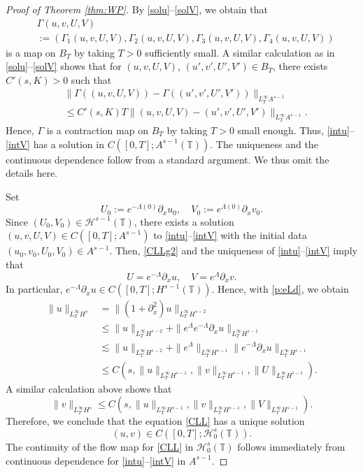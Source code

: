 \documentclass[%
11pt,  reqno]{amsart}
\newcommand{\T}{\mathbb{T}}
\renewcommand{\H}{\mathcal H}
\newcommand{\G}{\Gamma}
\newcommand{\Ld}{\Lambda}
\newcommand{\dx}{\partial_x}
\newcommand{\les}{\lesssim}
\numberwithin{equation}{section}
\numberwithin{theorem}{section}
\let\Im=\undefined\DeclareMathOperator*{\Im}{Im}
\begin{document}
\begin{proof}[Proof of Theorem \ref{thm:WP}]
By \eqref{solu}--\eqref{solV}, we obtain that 
\[
\begin{aligned}
&\G (u,v,U,V) 
\\
&:= (\G_1(u,v,U,V), \G_2(u,v,U,V), \G_3(u,v,U,V), \G_4(u,v,U,V))
\end{aligned}
\] 
is a map on $B_T$ by taking $T > 0$ sufficiently small.
A similar calculation as in \eqref{solu}--\eqref{solV} shows that for 
$(u,v, U, V)$, $(u', v', U', V') \in B_T$, there exists 
$C'(s, K) > 0$ such that
\[
\begin{aligned}
&\| \G((u, v, U, V)) - \G ((u',v',U',V')) \|_{L_T^\infty A^{s-1}}
\\
&\le
C'(s, K) T \|(u,v, U, V) - (u', v', U', V')\|_{L_T^\infty A^{s-1}}.
\end{aligned}
\] 
Hence, $\G$ is a contraction map on $B_T$ by taking $T > 0$ small enough.
Thus, \eqref{intu}--\eqref{intV} has a solution in $C([0,T]; A^{s-1}(\T))$.
The uniqueness and the continuous dependence follow from a standard argument.
We thus omit the details here.


Set 
\[
U_0 := e^{-\Ld(0)} \dx u_0, \quad V_0:= e^{\Ld(0)} \dx v_0.
\] 
Since $(U_0, V_0) \in \H^{s-1}(\T)$, 
there exists a solution $(u, v, U, V) \in C([0,T]; A^{s-1})$ to \eqref{intu}--\eqref{intV} with the initial data
$(u_0,v_0,U_0,V_0) \in A^{s-1}$. 
Then, \eqref{CLLg2} and the uniqueness of \eqref{intu}--\eqref{intV} imply that 
\[
U = e^{-\Ld} \dx u, \quad V = e^{\Ld} \dx v.
\]
In particular, $e^{-\Ld} \dx u \in C([0,T]; H^{s-1}(\T))$. 
Hence, with \eqref{p:eLd}, we obtain
\[
\begin{aligned}
\|u\|_{L_T^\infty H^s}
&= 
\|(1+\dx^2) u \|_{L_T^\infty H^{s-2}}
\\
&\le
\|u\|_{L_T^\infty H^{s-2}} + \| e^{\Ld} e^{-\Ld} \dx u \|_{L_T^\infty H^{s-1}}
\\
&\les
\|u\|_{L_T^\infty H^{s-2}} + \| e^{\Ld} \|_{L_T^\infty H^{s-1}} \| e^{-\Ld} \dx u \|_{L_T^\infty H^{s-1}} 
\\
&\le
C(s, \|u\|_{L_T^\infty H^{s-1}}, \|v\|_{L_T^\infty H^{s-1}}, \|U\|_{L_T^\infty H^{s-1}}).
\end{aligned}
\]
A similar calculation above shows that
\[
\|v\|_{L_T^\infty H^s} 
\le 
C(s, \|u\|_{L_T^\infty H^{s-1}}, \|v\|_{L_T^\infty H^{s-1}}, \|V\|_{L_T^\infty H^{s-1}}).
\]
Therefore, we conclude that the equation \eqref{CLL} has a unique solution 
\[
(u, v) \in C([0,T]; \H_0^s(\T)).
\]
The continuity of the flow map for \eqref{CLL} in $\H_0^s(\T)$
follows immediately from continuous dependence for \eqref{intu}--\eqref{intV} in $A^{s-1}$.
\end{proof}
\mbox{}
\end{document}
